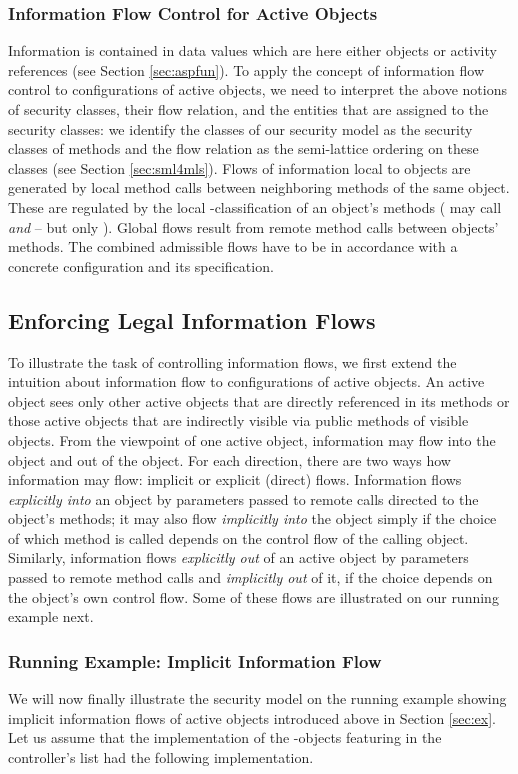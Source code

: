 \documentclass[10pt, conference, compsocconf]{IEEEtran}
\begin{document}
{\subsubsection*{Information Flow Control for Active Objects}
Information is contained in data values which are here either objects or activity references
(see Section \ref{sec:aspfun}).
To apply the concept of information flow control to configurations of active objects, we need to
interpret the above notions of security classes, their flow relation, and the entities that
are assigned to the security classes: we identify the classes of our security model 
as the security classes of methods and the flow relation as the semi-lattice ordering 
on these classes (see Section \ref{sec:sml4mls}). 
Flows of information local to objects are generated by local method calls between
neighboring methods of the same object. These are regulated by the local -classification of an 
object's methods ( may call  {\it and}  -- but  only ). 
Global flows result from remote method calls between objects' methods.
The combined admissible flows have to be in accordance with a concrete 
configuration and its  specification. 



\subsection{Enforcing Legal Information Flows}
To illustrate the task of controlling information flows, 
we first extend the intuition about information flow to configurations of active objects. 
An active object sees only other active objects that are directly referenced in its methods
or those active objects that are indirectly visible via public methods of visible objects.
From the viewpoint of one active object, 
information may flow into the object and out of the object.
For each direction, there are two ways how information may flow: implicit or explicit (direct) flows.
Information flows {\it explicitly into} an object by parameters passed to remote calls directed to 
the object's methods; it may also flow {\it implicitly into} the object simply if the choice
of which method is called depends on the control flow of the calling object. Similarly,
information flows {\it explicitly out} of an active object by parameters passed to remote method
calls and {\it implicitly out} of it, if the choice depends on the object's own control flow.
Some of these flows are illustrated on our running example next.

\subsubsection*{Running Example: Implicit Information Flow}
\label{sec:ifex}
We will now finally illustrate the security model on the running example showing
implicit information flows of active objects introduced above in Section \ref{sec:ex}. 
Let us assume that the implementation of the -objects featuring in the controller's list
had the following implementation.

}
\end{document}
